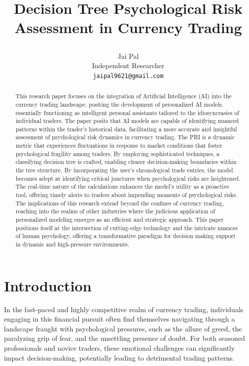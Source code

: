\documentclass{article}
\title{Decision Tree Psychological Risk Assessment in Currency Trading

}
\author{
  Jai Pal \\
  Independent Researcher \\
  \texttt{jaipal9621@gmail.com}
}
\begin{document}
\maketitle

\begin{abstract}
This research paper focuses on the integration of Artificial Intelligence (AI) into the currency trading landscape, positing the development of personalized AI models, essentially functioning as intelligent personal assistants tailored to the idiosyncrasies of individual traders. The paper posits that AI models are capable of identifying nuanced patterns within the trader's historical data, facilitating a more accurate and insightful assessment of psychological risk dynamics in currency trading. The PRI is a dynamic metric that experiences fluctuations in response to market conditions that foster psychological fragility among traders. By employing sophisticated techniques, a classifying decision tree is crafted, enabling clearer decision-making boundaries within the tree structure. By incorporating the user's chronological trade entries, the model becomes adept at identifying critical junctures when psychological risks are heightened. The real-time nature of the calculations enhances the model's utility as a proactive tool, offering timely alerts to traders about impending moments of psychological risks. The implications of this research extend beyond the confines of currency trading, reaching into the realms of other industries where the judicious application of personalized modeling emerges as an efficient and strategic approach. This paper positions itself at the intersection of cutting-edge technology and the intricate nuances of human psychology, offering a transformative paradigm for decision making support in dynamic and high-pressure environments.
\end{abstract}



\section{Introduction}
In the fast-paced and highly competitive realm of currency trading, individuals engaging in this financial pursuit often find themselves navigating through a landscape fraught with psychological pressures, such as the allure of greed, the paralyzing grip of fear, and the unsettling presence of doubt. For both seasoned professionals and novice traders, these emotional challenges can significantly impact decision-making, potentially leading to detrimental trading patterns.
\end{document}
